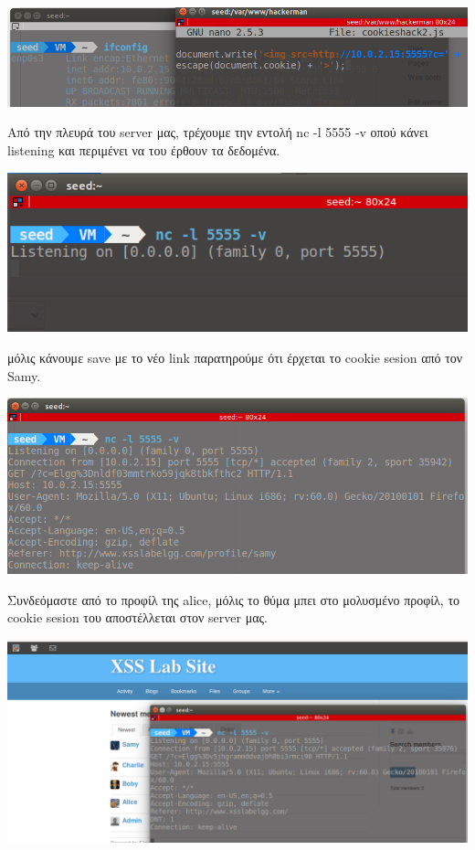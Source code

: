 \begin{center}
			\includegraphics[width=1\textwidth]{image/3.2.PNG}		
\end{center}
\noindent
Από την πλευρά του server μας, τρέχουμε την εντολή nc -l 5555 -v οπού 
κάνει listening και περιμένει να του έρθουν τα δεδομένα.

\begin{center}
			\includegraphics[width=1\textwidth]{image/3.3.PNG}		
\end{center}
\noindent
μόλις κάνουμε save με το νέο link παρατηρούμε ότι έρχεται το
cookie sesion από τον Samy.
\begin{center}
			\includegraphics[width=1\textwidth]{image/3.4.PNG}		
\end{center}
\noindent
Συνδεόμαστε από το προφίλ της alice, μόλις το θύμα μπει στο μολυσμένο προφίλ, το cookie sesion του αποστέλλεται στον server μας.
\begin{center}
			\includegraphics[width=1\textwidth]{image/3.5.PNG}		
\end{center}
\noindent


